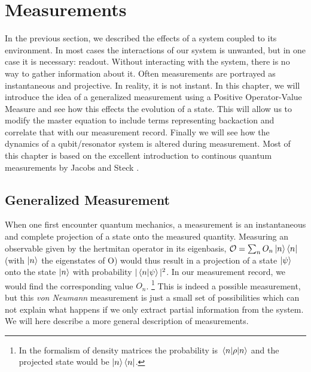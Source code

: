 \chapter{Measurements}\label{chap:measurements}
In the previous section, we described the effects of a system coupled to its environment. In most cases the interactions of our system is unwanted, but in one case it is necessary: readout. Without interacting with the system, there is no way to gather information about it. Often measurements are portrayed as instantaneous and projective. In reality, it is not instant. In this chapter, we will introduce the idea of a generalized measurement using a Positive Operator-Value Measure and see how this effects the evolution of a state. This will allow us to modify the master equation to include terms representing backaction and correlate that with our measurement record. Finally we will see how the dynamics of a qubit/resonator system is altered during measurement. Most of this chapter is based on the excellent introduction to continous quantum measurements by Jacobs and Steck \cite{jacobs_straightforward_2006}.

\section{Generalized Measurement}
When one first encounter quantum mechanics, a measurement is an instantaneous and complete projection of a state onto the measured quantity. Measuring an observable given by the hertmitan operator in its eigenbasis, $\mathcal{O} = \sum_n O_n \ket{n}\bra{n}$ (with $\ket{n}$ the eigenstates of O) would thus result in a projection of a state $\ket{\psi}$ onto the state $\ket{n}$ with probability $|\braket{n}{\psi}|^2$. In our measurement record, we would find the corresponding value $O_n$. \footnote{In the formalism of density matrices the probability is $\mel{n}{\rho}{n}$ and the projected state would be $\ket{n}\bra{n}$.} This is indeed a possible measurement, but this \textit{von Neumann} measurement is just a small set of possibilities which can not explain what happens if we only extract partial information from the system. We will here describe a more general description of measurements. 

